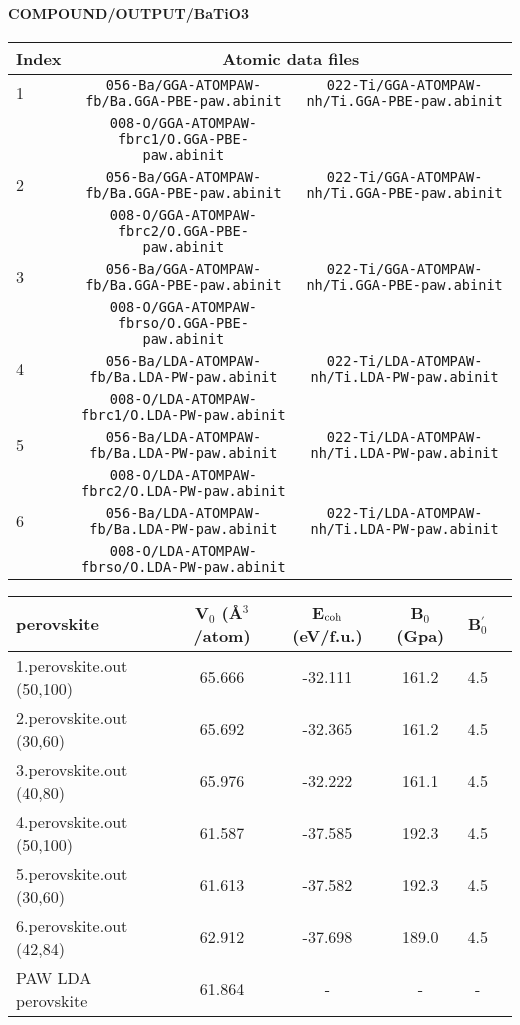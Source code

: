 \documentclass[onecolumn]{revtex4}
\begin{document}
\paragraph*{\bf{COMPOUND/OUTPUT/BaTiO3}}
\begin{center}
\begin{tabular}{lcc}
\hline
Index & \multicolumn{2}{c}{Atomic data files} \\
\hline
1 & \verb?056-Ba/GGA-ATOMPAW-fb/Ba.GGA-PBE-paw.abinit? & \verb?022-Ti/GGA-ATOMPAW-nh/Ti.GGA-PBE-paw.abinit? \\
& \verb?008-O/GGA-ATOMPAW-fbrc1/O.GGA-PBE-paw.abinit? & \\
2 & \verb?056-Ba/GGA-ATOMPAW-fb/Ba.GGA-PBE-paw.abinit? & \verb?022-Ti/GGA-ATOMPAW-nh/Ti.GGA-PBE-paw.abinit? \\
& \verb?008-O/GGA-ATOMPAW-fbrc2/O.GGA-PBE-paw.abinit? & \\
3 & \verb?056-Ba/GGA-ATOMPAW-fb/Ba.GGA-PBE-paw.abinit? & \verb?022-Ti/GGA-ATOMPAW-nh/Ti.GGA-PBE-paw.abinit? \\
& \verb?008-O/GGA-ATOMPAW-fbrso/O.GGA-PBE-paw.abinit? & \\
4 & \verb?056-Ba/LDA-ATOMPAW-fb/Ba.LDA-PW-paw.abinit? & \verb?022-Ti/LDA-ATOMPAW-nh/Ti.LDA-PW-paw.abinit? \\
& \verb?008-O/LDA-ATOMPAW-fbrc1/O.LDA-PW-paw.abinit? & \\
5 & \verb?056-Ba/LDA-ATOMPAW-fb/Ba.LDA-PW-paw.abinit? & \verb?022-Ti/LDA-ATOMPAW-nh/Ti.LDA-PW-paw.abinit? \\
& \verb?008-O/LDA-ATOMPAW-fbrc2/O.LDA-PW-paw.abinit? & \\
6 & \verb?056-Ba/LDA-ATOMPAW-fb/Ba.LDA-PW-paw.abinit? & \verb?022-Ti/LDA-ATOMPAW-nh/Ti.LDA-PW-paw.abinit? \\
& \verb?008-O/LDA-ATOMPAW-fbrso/O.LDA-PW-paw.abinit? & \\
\hline
\end{tabular}
\end{center}
\begin{center}
\begin{tabular}{lccccc}
\hline
\hline
\bf{perovskite}&V$_0$ (\AA$^3$/atom)&E$_{\rm coh}$ (eV/f.u.)&B$_0$ (Gpa)&B$_0^{'}$& \\
\hline
1.perovskite.out (50,100)& 65.666 &-32.111 & 161.2 & 4.5 & \\ 
2.perovskite.out (30,60)& 65.692 &-32.365 & 161.2 & 4.5 & \\ 
3.perovskite.out (40,80)& 65.976 &-32.222 & 161.1 & 4.5 & \\ 
4.perovskite.out (50,100)& 61.587 &-37.585 & 192.3 & 4.5 & \\ 
5.perovskite.out (30,60)& 61.613 &-37.582 & 192.3 & 4.5 & \\ 
6.perovskite.out (42,84)& 62.912 &-37.698 & 189.0 & 4.5 & \\ 
PAW LDA perovskite~\cite{Dieguez_PRB69_2004} & 61.864 & - & - & - \\ %
\hline
\hline
\end{tabular}
\end{center}
\end{document}

